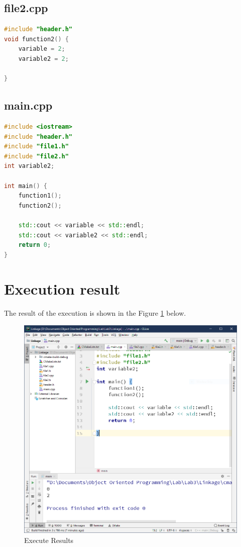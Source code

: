 \documentclass[a4paper]{report}
\begin{document}
\subsection{file2.cpp}
\begin{lstlisting}[language=C++]
#include "header.h"
void function2() {
    variable = 2;
    variable2 = 2;

}
\end{lstlisting}

\subsection{main.cpp}
\begin{lstlisting}[language=C++]
#include <iostream>
#include "header.h"
#include "file1.h"
#include "file2.h"
int variable2;

int main() {
    function1();
    function2();

    std::cout << variable << std::endl;
    std::cout << variable2 << std::endl;
    return 0;
}
\end{lstlisting}



\section{Execution result}
The result of the execution is shown in the Figure \ref{1} below.

\begin{figure}
  \centering
  \includegraphics[scale=0.5]{result1.PNG}
  \caption{Execute Results}\label{1}
\end{figure}
\end{document}
